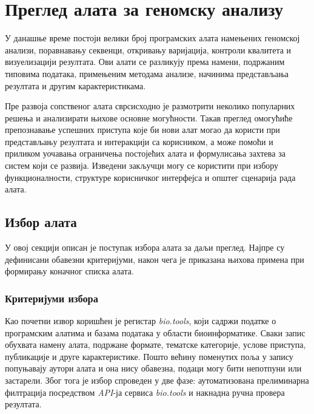 \documentclass[12pt,oneside]{memoir}
\begin{document}
\chapter{Преглед алата за геномску анализу}
У данашње време постоји велики број програмских алата намењених геномској анализи, поравнавању секвенци, откривању варијација, контроли квалитета и визуелизацији резултата. Ови алати се разликују према намени, подржаним типовима података, примењеним методама анализе, начинима представљања резултата и другим карактеристикама.

Пре развоја сопственог алата сврсисходно је размотрити неколико популарних решења и анализирати њихове основне могућности. Такав преглед омогућиће препознавање успешних приступа које би нови алат могао да користи при представљању резултата и интеракцији са корисником, а може помоћи и приликом уочавања ограничења постојећих алата и формулисања захтева за систем који се развија. Изведени закључци могу се користити при избору функционалности, структуре корисничког интерфејса и општег сценарија рада алата.


\section{Избор алата}
У овој секцији описан је поступак избора алата за даљи преглед. Најпре су дефинисани обавезни критеријуми, након чега је приказана њихова примена при формирању коначног списка алата.

\subsection{Критеријуми избора}
Као почетни извор коришћен је регистар \textit{bio.tools}, који садржи податке о програмским алатима и базама података у области биоинформатике. Сваки запис обухвата намену алата, подржане формате, тематске категорије, услове приступа, публикације и друге карактеристике. Пошто већину поменутих поља у запису попуњавају аутори алата и она нису обавезна, подаци могу бити непотпуни или застарели. Због тога је избор спроведен у две фазе: аутоматизована прелиминарна филтрација посредством \textit{API}-ја сервиса \textit{bio.tools} и накнадна ручна провера резултата.
\end{document}
